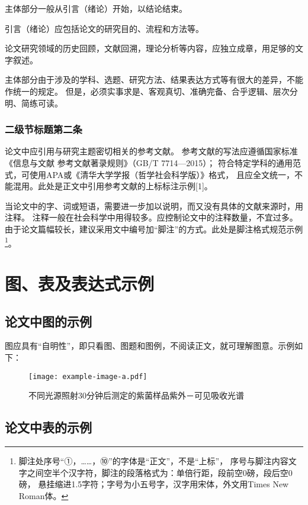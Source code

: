 \documentclass[degree=bachelor]{thuthesis}
\begin{document}
主体部分一般从引言（绪论）开始，以结论结束。

引言（绪论）应包括论文的研究目的、流程和方法等。

论文研究领域的历史回顾，文献回溯，理论分析等内容，应独立成章，用足够的文字叙述。

主体部分由于涉及的学科、选题、研究方法、结果表达方式等有很大的差异，不能作统一的规定。
但是，必须实事求是、客观真切、准确完备、合乎逻辑、层次分明、简练可读。


\subsection{二级节标题第二条}

论文中应引用与研究主题密切相关的参考文献。
参考文献的写法应遵循国家标准《信息与文献 参考文献著录规则》（GB/T 7714—2015）；
符合特定学科的通用范式，可使用APA或《清华大学学报（哲学社会科学版）》格式，
且应全文统一，不能混用。此处是正文中引用参考文献的上标标注示例[1]。

当论文中的字、词或短语，需要进一步加以说明，而又没有具体的文献来源时，用注释。
注释一般在社会科学中用得较多。应控制论文中的注释数量，不宜过多。
由于论文篇幅较长，建议采用文中编号加“脚注”的方式。此处是脚注格式规范示例
\footnote{%
  脚注处序号“①，……，⑩”的字体是“正文”，不是“上标”，
  序号与脚注内容文字之间空半个汉字符，脚注的段落格式为：单倍行距，段前空0磅，段后空0磅，
  悬挂缩进1.5字符；字号为小五号字，汉字用宋体，外文用Times New Roman体。
}。



\chapter{图、表及表达式示例}

\section{论文中图的示例}

图应具有“自明性”，即只看图、图题和图例，不阅读正文，就可理解图意。示例如下：

\begin{figure}[h]
  \centering
  \texttt{[image: example-image-a.pdf]}
  \caption{不同光源照射30分钟后测定的紫菌样品紫外－可见吸收光谱}
  \label{fig:example-1}
\end{figure}


\section{论文中表的示例}
\end{document}
